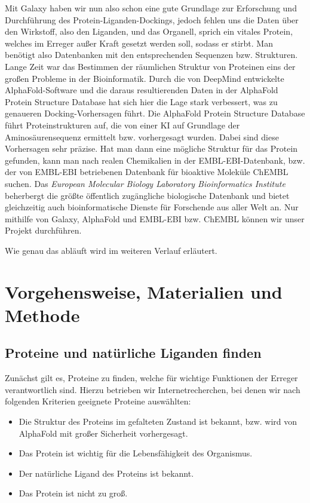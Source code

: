 \documentclass[10pt]{article}
\begin{document}
    Mit Galaxy haben wir nun also schon eine gute Grundlage zur Erforschung und Durchführung des
    Protein-Liganden-Dockings, jedoch fehlen uns die Daten über den Wirkstoff, also den Liganden, und das Organell,
    sprich ein vitales Protein, welches im Erreger außer Kraft gesetzt werden soll, sodass er stirbt. Man benötigt
    also Datenbanken mit den entsprechenden Sequenzen bzw. Strukturen. Lange Zeit war das Bestimmen der räumlichen
    Struktur von Proteinen eins der großen Probleme in der Bioinformatik. Durch die von DeepMind entwickelte
    AlphaFold-Software und die daraus resultierenden Daten in der AlphaFold Protein Structure Database hat sich hier
    die Lage stark verbessert, was zu genaueren Docking-Vorhersagen führt. Die AlphaFold Protein Structure Database
    führt Proteinstrukturen auf, die von einer KI auf Grundlage der Aminosäurensequenz ermittelt bzw. vorhergesagt
    wurden.\cite{13} Dabei sind diese Vorhersagen sehr präzise.
    Hat man dann eine mögliche Struktur für das Protein gefunden,
    kann man nach realen Chemikalien in der EMBL-EBI-Datenbank, bzw. der von EMBL-EBI betriebenen Datenbank für
    bioaktive Moleküle ChEMBL suchen.\cite{7, 9, 10, 30} Das \emph{European Molecular Biology
    Laboratory Bioinformatics Institute}
    beherbergt
    die größte öffentlich zugängliche biologische Datenbank und bietet gleichzeitig auch bioinformatische Dienste für
    Forschende aus aller Welt an. Nur mithilfe von Galaxy, AlphaFold und EMBL-EBI bzw. ChEMBL können wir unser
    Projekt durchführen.

    Wie genau das abläuft wird im weiteren Verlauf erläutert.


    \section{Vorgehensweise, Materialien und Methode}\label{sec:vorgehensweise-materialien-und-methode}

    \subsection{Proteine und natürliche Liganden finden}\label{subsec:proteine-und-natuerliche-liganden-finden}

    Zunächst gilt es, Proteine zu finden, welche für wichtige Funktionen der Erreger verantwortlich sind.
    Hierzu betrieben wir Internetrecherchen, bei denen wir nach folgenden Kriterien geeignete Proteine auswählten:

    \begin{itemize}
        \item Die Struktur des Proteins im gefalteten Zustand ist bekannt, bzw. wird von AlphaFold mit großer
        Sicherheit vorhergesagt.
        \item Das Protein ist wichtig für die Lebensfähigkeit des Organismus.
        \item Der natürliche Ligand des Proteins ist bekannt.
        \item Das Protein ist nicht zu groß.
    \end{itemize}
\end{document}
